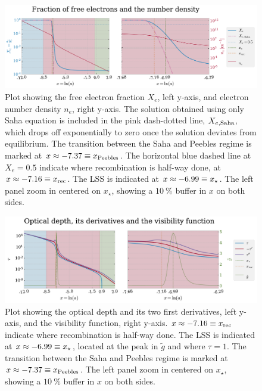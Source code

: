 \documentclass[10pt,a4paper]{article}
\begin{document}
\begin{figure}[ht]
    \centering
    \includegraphics[scale=0.5]{../figs/free_electrons.pdf}
    \caption{Plot showing the free electron fraction $X_e$, left y-axis, and electron number density $n_e$, right y-axis. The solution obtained using only Saha equation is included in the pink dash-dotted line, $X_{e,\rm{Saha}}$, which drops off exponentially to zero once the solution deviates from equilibrium. The transition between the Saha and Peebles regime is marked at $x\approx-7.37 \equiv x_{\rm{Peebles}}$. The horizontal blue dashed line at $X_e=0.5$ indicate where recombination is half-way done, at $x\approx-7.16\equiv x_{\rm{rec}}$. The LSS is indicated at $x\approx-6.99\equiv x_{\rm{\star}}$. The left panel zoom in centered on $x_{\star}$, showing a $\SI{10}{\%}$ buffer in $x$ on both sides.}
    \label{fig:Xe and ne}
\end{figure}

\begin{figure}[ht]
    \centering
    \includegraphics[scale=0.5]{../figs/optical_depth.pdf}
    \caption{Plot showing the optical depth and its two first derivatives, left y-axis, and the visibility function, right y-axis. $x\approx-7.16\equiv x_{\rm{rec}}$ indicate where recombination is half-way done. The LSS is indicated at $x\approx-6.99\equiv x_{\rm{\star}}$, located at the peak in $\tilde{g}$ and where $\tau=1$. The transition between the Saha and Peebles regime is marked at $x\approx-7.37 \equiv x_{\rm{Peebles}}$. The left panel zoom in centered on $x_{\star}$, showing a $\SI{10}{\%}$ buffer in $x$ on both sides.}
    \label{fig:tau}
\end{figure}
\end{document}
